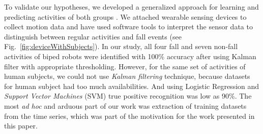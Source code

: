 \documentclass{IEEEtran}
\begin{document}
\par
To validate our hypotheses, we developed a generalized approach for learning 
and predicting activities of both groups \cite{abeyruwanFlairs2015}.  We attached wearable sensing devices to collect
motion data and have used software tools to interpret the sensor data to distinguish 
between regular activities and fall events (see Fig.~\ref{fig:deviceWithSubjects}). 
In our study, all four fall and seven non-fall activities of biped robots were identified with 100\%  accuracy after using Kalman filter \cite{Welch:1995:IKF:897831} with appropriate thresholding. However, for the same set of activities of human subjects, we could not use \emph{Kalman filtering} technique, because datasets for human subject had too much availabilities. And using Logistic Regression and \emph{Support Vector Machines} (SVM) true positive recognition was low as 90\%. The most \emph{ad hoc} and arduous part of our work was extraction of training datasets from the time series, which was part of the motivation for the work presented in this paper.

%



\end{document}
